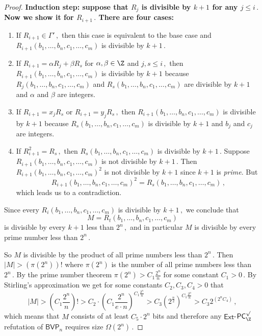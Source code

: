 \documentclass{toc}
\begin{document}
\begin{proof}
\bfseries Induction step: \mdseries suppose that $R_j$ is divisible by $k + 1$ for any %
$j \le i\,.$ %
 Now we show it for %
$R_{i + 1}\,.$ %
 There are four cases:
\begin{enumerate}
    \item If %
$R_{i + 1} \in \Gamma'\,,$ %
 then this case is equivalent to the base case and $R_{i + 1}(b_1, \ldots, b_n, c_1, \ldots, c_m)$ is divisible by %
$k + 1\,.$ %
    \item If $R_{i + 1} = \alpha R_j + \beta R_s$ for $\alpha, \beta \in \Z$ and %
$j, s \le i\,,$ %
 then
    $R_{i + 1}(b_1, \ldots, b_n, c_1, \ldots, c_m)$ is divisible by $k + 1$ because $R_j(b_1, \ldots, b_n, c_1, \ldots, c_m)$ and $R_s(b_1, \ldots, b_n, c_1, \ldots, c_m)$ are divisible by $k + 1$ and $\alpha$ and $\beta$ are integers.
    \item If $R_{i + 1} = x_j R_s$ or %
$R_{i + 1} = y_j R_s\,,$ %
 then $R_{i + 1}(b_1, \ldots, b_n, c_1, \ldots, c_m)$ is divisible by $k + 1$ because $R_s(b_1, \ldots, b_n, c_1, \ldots, c_m)$ is divisible by $k + 1$ and $b_j$ and $c_j$ are integers.
    \item If %
$R_{i + 1}^2 = R_s\,,$ %
 then $R_s(b_1, \ldots, b_n, c_1, \ldots, c_m)$ is divisible by %
$k + 1\,.$ %
 Suppose \\ $R_{i + 1}(b_1, \ldots, b_n, c_1, \ldots, c_m)$ is not divisible by %
$k + 1\,.$ %
 Then $R_{i + 1}(b_1, \ldots, b_n, c_1, \ldots, c_m)^2$ is not divisible by $k + 1$ since $k + 1$ is \emph{prime}. But %
%
$$R_{i + 1}(b_1, \ldots, b_n, c_1, \ldots, c_m)^2 = R_s(b_1, \ldots, b_n, c_1, \ldots, c_m)\,,$$ %
which leads us to a contradiction. 
\end{enumerate}
Since every $R_{i}(b_1, \ldots, b_n, c_1, \ldots, c_m)$ is divisible by %
$k + 1\,,$ %
 we conclude that
%
$$M = R_{t}(b_1, \ldots, b_n,  c_1, \ldots, c_m)$$   %
is divisible by every $k + 1$ less than %
$2^n\,,$ %
 and in particular  $M$ is divisible by every prime number less than %
$2^n\,.$ %


So $M$ is divisible by the product of all prime numbers less than %
$2^n\,.$ %
 Then $|M| > (\pi(2^n))!$ where $\pi(2^n)$ is the number of all prime numbers less than %
$2^n\,.$ %
 By the prime number theorem $\pi(2^n) > C_1 \frac{2^n}{n}$ for some constant %
$C_1 > 0\,.$ %
 By Stirling's approximation we get for some constants $C_2, C_3, C_4 > 0$ that
$$
%
|M| > \left(C_1 \frac{2^n}{n}\right)! > C_2 \cdot \left(C_1  \frac{2^n}{e \cdot n}\right)^{C_1  \frac{2^n}{n}} > C_3 \left(2^{\frac{n}{2}}\right)^{C_1  \frac{2^n}{n}} > C_3 2^{(2^n C_4)}\,, %
$$
which means that $M$ consists of at least $C_5 \cdot 2^n$ bits and therefore any $\mathsf{Ext}$-$\mathsf{PC}^{\surd}_{\Z}$ refutation of $\mathsf{BVP}_n$  requires size %
$\Omega(2^n)\,.$ %
\end{proof}
\end{document}
